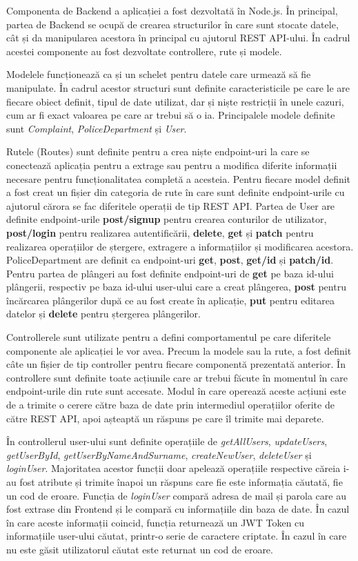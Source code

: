 \documentclass[12pt,a4paper]{report}
\theoremstyle{definition}
\theoremstyle{remark}
\begin{document}
Componenta de Backend a aplicației a fost dezvoltată în Node.js. În principal, partea de Backend se ocupă de crearea structurilor în care sunt stocate datele, cât și da manipularea acestora în principal cu ajutorul REST API-ului. În cadrul acestei componente au fost dezvoltate controllere, rute și modele.

Modelele funcționează ca și un schelet pentru datele care urmează să fie manipulate. În cadrul acestor structuri sunt definite caracteristicile pe care le are fiecare obiect definit, tipul de date utilizat, dar și niște restricții în unele cazuri, cum ar fi exact valoarea pe care ar trebui să o ia. Principalele modele definite sunt \emph{Complaint}, \emph{PoliceDepartment} și \emph{User}. 

Rutele (Routes) sunt definite pentru a crea niște endpoint-uri la care se conectează aplicația pentru a extrage sau pentru a modifica diferite informații necesare pentru funcționalitatea completă a acesteia. Pentru fiecare model definit a fost creat un fișier din categoria de rute în care sunt definite endpoint-urile cu ajutorul cărora se fac diferitele operații de tip REST API. Partea de User are definite endpoint-urile \textbf{post/signup} pentru crearea conturilor de utilizator, \textbf{post/login} pentru realizarea autentificării, \textbf{delete}, \textbf{get} și \textbf{patch} pentru realizarea operațiilor de ștergere, extragere a informațiilor și modificarea acestora. PoliceDepartment are definit ca endpoint-uri \textbf{get}, \textbf{post}, \textbf{get/id} și \textbf{patch/id}. Pentru partea de plângeri au fost definite endpoint-uri de \textbf{get} pe baza id-ului plângerii, respectiv pe baza id-ului user-ului care a creat plângerea,  \textbf{post} pentru încărcarea plângerilor după ce au fost create în aplicație, \textbf{put} pentru editarea datelor și \textbf{delete} pentru ștergerea plângerilor.

Controllerele sunt utilizate pentru a defini comportamentul pe care diferitele componente ale aplicației le vor avea. Precum la modele sau la rute, a fost definit câte un fișier de tip controller pentru fiecare componentă prezentată anterior. În controllere sunt definite toate acțiunile care ar trebui făcute în momentul în care endpoint-urile din rute sunt accesate. Modul în care operează aceste acțiuni este de a trimite o cerere către baza de date prin intermediul operațiilor oferite de către REST API, apoi așteaptă un răspuns pe care îl trimite mai deparete.

În controllerul user-ului sunt definite operațiile de \emph{getAllUsers}, \emph{updateUsers}, \emph{getUserById}, \emph{getUserByNameAndSurname}, \emph{createNewUser}, \emph{deleteUser} și \emph{loginUser}. Majoritatea acestor funcții doar apelează operațiile respective căreia i-au fost atribute și trimite înapoi un răspuns care fie este informația căutată, fie un cod de eroare. Funcția de \emph{loginUser} compară adresa de mail și parola care au fost extrase din Frontend și le compară cu informațiile din baza de date. În cazul în care aceste informații coincid, funcția returnează un JWT Token cu informațiile user-ului căutat, printr-o serie de caractere criptate. În cazul în care nu este găsit utilizatorul căutat este returnat un cod de eroare.
\end{document}
